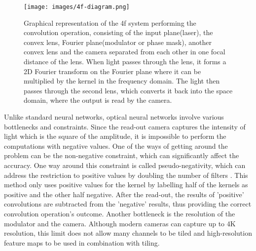 \documentclass{article}
\begin{document}
\begin{figure}[H]
\centering
\texttt{[image: images/4f-diagram.png]}
\caption{Graphical representation of the 4f system performing the convolution operation, consisting of the input plane(laser), the convex lens, Fourier plane(modulator or phase mask), another convex lens and the camera separated from each other in one focal distance of the lens. When light passes through the lens, it forms a 2D Fourier transform on the Fourier plane where it can be multiplied by the kernel in the frequency domain. The light then passes through the second lens, which converts it back into the space domain, where the output is read by the camera.
\label{fig1}}

\end{figure}   


Unlike standard neural networks, optical neural networks involve various bottlenecks and constraints. Since the read-out camera captures the intensity of light which is the square of the amplitude, it is impossible to perform the computations with negative values. One of the ways of getting around the problem can be the non-negative constraint, which can significantly affect the accuracy. One way around this constraint is called pseudo-negativity, which can address the restriction to positive values by doubling the number of filters  \cite{chang_hybrid_2018}. This method only uses positive values for the kernel by labelling half of the kernels as positive and the other half negative. After the read-out, the results of 'positive' convolutions are subtracted from the 'negative' results, thus providing the correct convolution operation's outcome. Another bottleneck is the resolution of the modulator and the camera. Although modern cameras can capture up to 4K resolution, this limit does not allow many channels to be tiled and high-resolution feature maps to be used in combination with tiling. 
\end{document}
